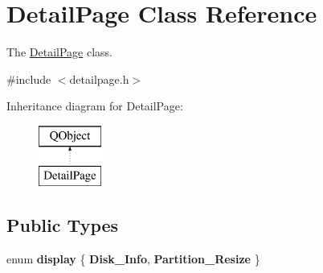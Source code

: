 \hypertarget{class_detail_page}{}\section{Detail\+Page Class Reference}
\label{class_detail_page}


The \mbox{\hyperlink{class_detail_page}{Detail\+Page}} class.  




{\ttfamily \#include $<$detailpage.\+h$>$}

Inheritance diagram for Detail\+Page\+:\begin{figure}[H]
\begin{center}
\leavevmode
\includegraphics[height=2.000000cm]{class_detail_page}
\end{center}
\end{figure}
\subsection*{Public Types}
\begin{DoxyCompactItemize}
\item 
\mbox{\label{class_detail_page_a6d248111c750ab7d0110aa14c58f77e4}} 
enum {\bfseries display} \{ {\bfseries Disk\+\_\+\+Info}, 
{\bfseries Partition\+\_\+\+Resize}
 \}
\end{DoxyCompactItemize}
